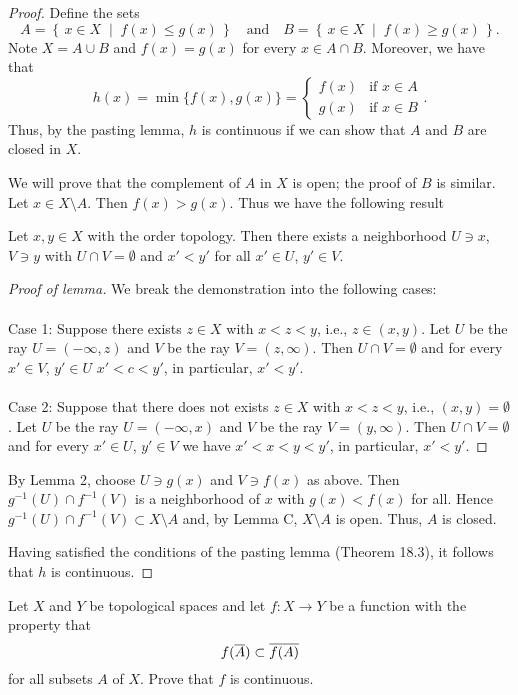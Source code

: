 \begin{proof}
Define the sets
\[
A=\left\{\,x\in X\;\middle|\;f(x)\leq g(x)\,\right\}
\quad\text{and}\quad
B=\left\{\,x\in X\;\middle|\;f(x)\geq g(x)\,\right\}.
\]
Note $X=A\cup B$ and $f(x)=g(x)$ for every $x\in A\cap
B$. Moreover, we have that
\[
h(x)
=\min\{f(x),g(x)\}
=\begin{cases}
f(x)&\text{if $x\in A$}\\
g(x)&\text{if $x\in B$}
\end{cases}.
\]
Thus, by the pasting lemma, $h$ is continuous if we can show that
$A$ and $B$ are closed in $X$.

We will prove that the complement of $A$ in $X$ is open; the
proof of $B$ is similar. Let $x\in X\setminus A$. Then
$f(x)>g(x)$. Thus we have the following result
\begin{lemma}
Let $x,y\in X$ with the order topology. Then there exists a
neighborhood $U\ni x$, $V\ni y$ with $U\cap V=\emptyset$ and
$x'<y'$ for all $x'\in U$, $y'\in V$.
\end{lemma}
\begin{proof}[Proof of lemma]
\renewcommand\qedsymbol{$\clubsuit$}
We break the demonstration into the following cases:
\\\\
Case 1: Suppose there exists $z\in X$ with $x<z<y$, i.e.,
$z\in(x,y)$. Let $U$ be the ray $U=(-\infty,z)$ and $V$ be the
ray $V=(z,\infty)$. Then $U\cap V=\emptyset$ and for every $x'\in
V$, $y'\in U$ $x'<c<y'$, in particular, $x'<y'$.
\\\\
Case 2: Suppose that there does not exists $z\in X$ with $x<z<y$,
i.e., $(x,y)=\emptyset$. Let $U$ be the ray $U=(-\infty,x)$ and
$V$ be the ray $V=(y,\infty)$. Then $U\cap V=\emptyset$ and for
every $x'\in U$, $y'\in V$ we have $x'<x<y<y'$, in particular,
$x'<y'$.
\end{proof}

By Lemma 2, choose $U\ni g(x)$ and $V\ni f(x)$ as above. Then
$g^{-1}(U)\cap f^{-1}(V)$ is a neighborhood of $x$ with
$g(x)<f(x)$ for all. Hence $g^{-1}(U)\cap f^{-1}(V)\subset
X\setminus A$ and, by Lemma C, $X\setminus A$ is open. Thus, $A$
is closed.

Having satisfied the conditions of the pasting lemma (Theorem 18.3), it follows
that $h$ is continuous.
\end{proof}
\begin{problem}
Let $X$ and $Y$ be topological spaces and let $f\colon X\to Y$ be
a function with the property that
\[
f(\overline{A})\subset\overline{f(A)}
\]
for all subsets $A$ of $X$. Prove that $f$ is continuous.
\end{problem}
